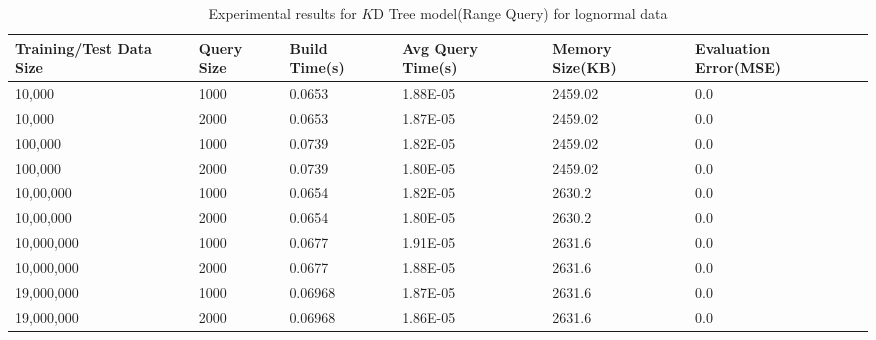 \begin{table}
	\centering
	\begin{tabular}{||p{}<{\centering}|p{}<{\centering}| p{}<{\centering}|p{}<{\centering}|p{}<{\centering}|p{}<{\centering}||}
		\hline
		Training/Test Data Size & Query Size & Build Time(s) & Avg Query Time(s) & Memory Size(KB) & Evaluation Error(MSE)\\ 
		[0.5ex] 
        \hline
		\hline
		10,000& 1000 & 0.0653 & 1.88E-05 & 2459.02&0.0\\
		\hline
		10,000& 2000 & 0.0653 & 1.87E-05 & 2459.02& 0.0\\
		\hline
		100,000& 1000 & 0.0739 & 1.82E-05 & 2459.02& 0.0\\
		\hline
		100,000& 2000 & 0.0739 & 1.80E-05 & 2459.02& 0.0\\
		\hline
		10,00,000& 1000 & 0.0654 & 1.82E-05 & 2630.2& 0.0\\
		\hline
		10,00,000& 2000 & 0.0654 & 1.80E-05 & 2630.2& 0.0\\
		\hline 
		10,000,000& 1000 & 0.0677 & 1.91E-05 & 2631.6& 0.0\\
		\hline
		10,000,000& 2000 &0.0677 & 1.88E-05 & 2631.6& 0.0\\
		\hline
		19,000,000& 1000 & 0.06968 & 1.87E-05 & 2631.6& 0.0\\
		\hline
		19,000,000& 2000 & 0.06968 & 1.86E-05 & 2631.6& 0.0\\
        \hline
		\hline
	\end{tabular}
    \label{lognormal_KD_Tree_Range_Query}
	\caption{Experimental results for $K$D Tree model(Range Query) for lognormal data}
\end{table}


